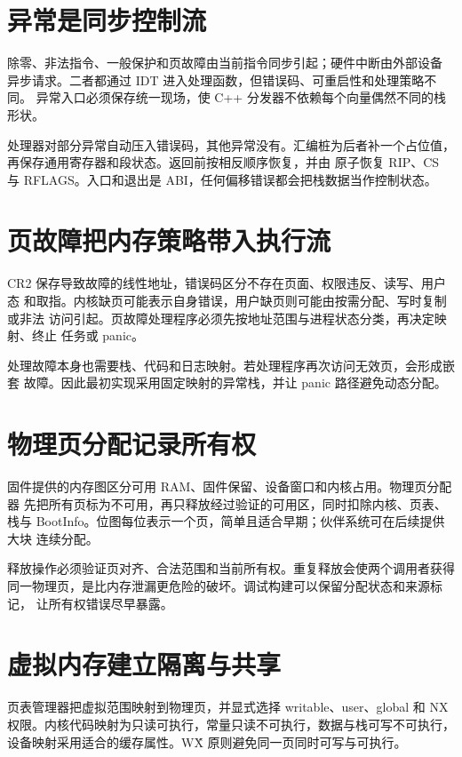\section{异常是同步控制流}

除零、非法指令、一般保护和页故障由当前指令同步引起；硬件中断由外部设备
异步请求。二者都通过 IDT 进入处理函数，但错误码、可重启性和处理策略不同。
异常入口必须保存统一现场，使 C++ 分发器不依赖每个向量偶然不同的栈形状。

处理器对部分异常自动压入错误码，其他异常没有。汇编桩为后者补一个占位值，
再保存通用寄存器和段状态。返回前按相反顺序恢复，并由  原子恢复
RIP、CS 与 RFLAGS。入口和退出是 ABI，任何偏移错误都会把栈数据当作控制状态。

\section{页故障把内存策略带入执行流}

CR2 保存导致故障的线性地址，错误码区分不存在页面、权限违反、读写、用户态
和取指。内核缺页可能表示自身错误，用户缺页则可能由按需分配、写时复制或非法
访问引起。页故障处理程序必须先按地址范围与进程状态分类，再决定映射、终止
任务或 panic。

处理故障本身也需要栈、代码和日志映射。若处理程序再次访问无效页，会形成嵌套
故障。因此最初实现采用固定映射的异常栈，并让 panic 路径避免动态分配。

\section{物理页分配记录所有权}

固件提供的内存图区分可用 RAM、固件保留、设备窗口和内核占用。物理页分配器
先把所有页标为不可用，再只释放经过验证的可用区，同时扣除内核、页表、栈与
BootInfo。位图每位表示一个页，简单且适合早期；伙伴系统可在后续提供大块
连续分配。

释放操作必须验证页对齐、合法范围和当前所有权。重复释放会使两个调用者获得
同一物理页，是比内存泄漏更危险的破坏。调试构建可以保留分配状态和来源标记，
让所有权错误尽早暴露。

\section{虚拟内存建立隔离与共享}

页表管理器把虚拟范围映射到物理页，并显式选择 writable、user、global 和
NX 权限。内核代码映射为只读可执行，常量只读不可执行，数据与栈可写不可执行，
设备映射采用适合的缓存属性。W\^X 原则避免同一页同时可写与可执行。

